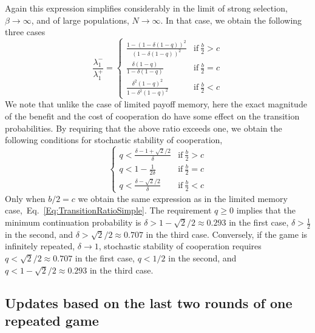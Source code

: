 \documentclass[11pt]{article}
\theoremstyle{plainCl1}
\theoremstyle{plainCl2}
\begin{document}
Again this expression simplifies considerably in the limit of strong selection, \(\beta \rightarrow \infty\), and of large
populations, \(N \rightarrow \infty \). In that case, we obtain the following three cases
\begin{equation} \label{Eq:RatioTransitionTwoInteraction}
\frac{\lambda^{-}_1}{\lambda^{+}_1} = 
\begin{cases}
 \frac{1-(1-\delta(1-q))^2}{(1-\delta(1-q))^2} &\text{if}~ \frac{b}{2} > c \\[0.2cm]
  \frac{\delta(1-q)}{1-\delta(1-q)}  &\text{if}~ \frac{b}{2} = c \\[0.2cm]
  \frac{\delta^2(1-q)^2}{1-\delta^2(1-q)^2} &\text{if}~\frac{b}{2} < c
\end{cases}
\end{equation}
We note that unlike the case of limited payoff memory, here the exact magnitude of the benefit and the cost of cooperation do have some effect on the transition probabilities. 
By requiring that the above ratio exceeds one, we obtain the following conditions for stochastic stability of cooperation, 
\begin{equation} \label{Eq:Condition_TwoGames}
\begin{cases}
  q <\frac{\delta - 1 + \sqrt{2}/2}{\delta}	&\text{if}~ \frac{b}{2} > c \\[0.15cm]
  q<1-\frac{1}{2\delta}	&\text{if}~\frac{b}{2}=c\\[0.15cm]
  q <\frac{\delta - \sqrt{2}/2}{\delta}\ &\text{if}~\frac{b}{2} < c
\end{cases}
\end{equation}
Only when \(b/2\!=\!c\) we obtain the same expression as in the limited memory case,~Eq.~\eqref{Eq:TransitionRatioSimple}. 
The requirement $q\!\ge\!0$ implies that the minimum continuation probability is $\delta\!>\!1\!-\!\sqrt{2}/2\approx 0.293$ in the first case, $\delta\!>\!\frac{1}{2}$ in the second, and $\delta>\sqrt{2}/2\approx 0.707$ in the third case. 
Conversely, if the game is infinitely repeated, $\delta\!\rightarrow\!1$, stochastic stability of cooperation requires $q<\sqrt{2}/2\approx 0.707$ in the first case, $q<1/2$ in the second, and $q<1\!-\!\sqrt{2}/2\approx 0.293$ in the third case. 




\subsection{Updates based on the last two rounds of one repeated game}
\label{section:m_two_n_one}
\end{document}
